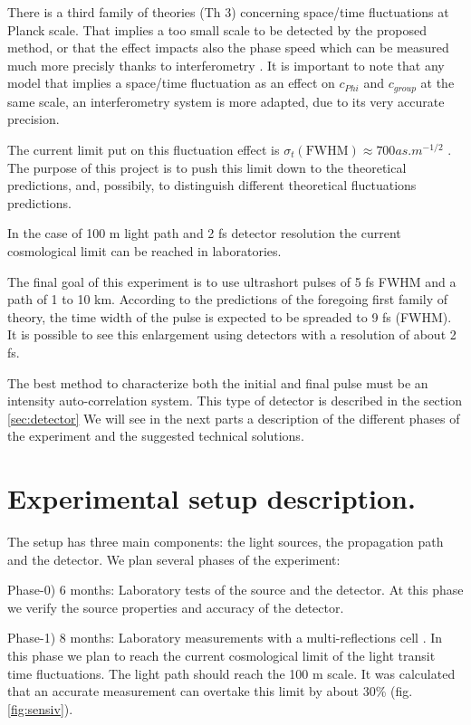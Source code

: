 \documentclass[9pt, a4, twoside]{article}
\begin{document}
There is a third family of theories (Th 3) concerning space/time fluctuations at Planck scale. That implies a too small scale to be detected by the proposed method, or that the effect impacts also the phase speed which can be measured much more precisly thanks to interferometry \cite{th3}.
It is important to note that any model that implies a space/time fluctuation as an effect on $c_{Phi}$ and $c_{group}$ at the same scale, an interferometry system is more adapted, due to its very accurate precision.

The current limit put on this fluctuation effect is $\sigma_t(\text{FWHM}) \approx 700 as.m^{-1/2}$ \cite {cosmoobs}. The purpose of this project is to push this limit down to the theoretical predictions, and, possibily, to distinguish different theoretical fluctuations predictions.

In the case of 100 m light path and 2 fs detector resolution the current cosmological limit can be reached in laboratories. 

The final goal of this experiment is to use ultrashort pulses of 5 fs FWHM and a path of 1 to 10 km. According to the predictions of the foregoing first family of theory, the time width of the pulse is expected to be spreaded to 9 fs (FWHM). It is possible to see this enlargement using detectors with a resolution of about 2 fs. 

The best method to characterize both the initial and final pulse must be an intensity auto-correlation system. This type of detector is described in the section \ref {sec:detector}
We will see in the next parts a description of the different phases of the experiment and the suggested technical solutions. 

\section {Experimental setup description.}

The setup has three main components: the light sources, the propagation path and the detector. We plan several phases of the experiment:

Phase-0) 6 months: Laboratory tests of the source and the detector. At this phase we verify the source properties and accuracy of the detector.

Phase-1) 8 months: Laboratory measurements with a multi-reflections cell \cite{herriottcell}. In this phase we plan to reach the current cosmological limit of the light transit time fluctuations. The light path should reach the 100 m scale. It was calculated that an accurate measurement can overtake this limit by about 30\% (fig. \ref {fig:sensiv}). 
\end{document}
